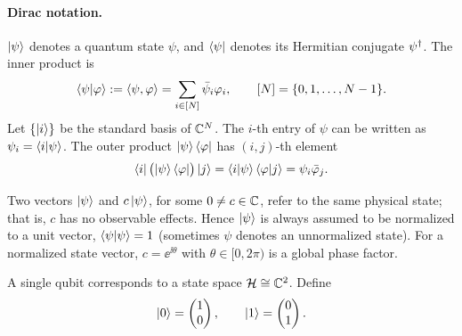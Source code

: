 \paragraph{Dirac notation.}
$\ket{\psi}$ denotes a quantum state $\psi$, and $\bra{\psi}$ denotes its
Hermitian conjugate $\psi^{\dagger}$. The inner product is
\begin{equation}
  \braket{\psi|\varphi} := \langle \psi, \varphi \rangle
  = \sum_{i \in [N]} \bar{\psi}_i \varphi_i,
  \qquad [N] = \{0, 1, \dots, N-1\}.
\end{equation}
Let $\{\ket{i}\}$ be the standard basis of $\mathbb{C}^N$. The $i$-th entry of $\psi$ can
be written as $\psi_i = \braket{i|\psi}$. The outer product $\ket{\psi}\bra{\varphi}$
has $(i,j)$-th element
\begin{equation}
  \bra{i}\bigl(\ket{\psi}\bra{\varphi}\bigr)\ket{j}
  = \braket{i|\psi}\braket{\varphi|j} = \psi_i \bar{\varphi}_j.
\end{equation}

Two vectors $\ket{\psi}$ and $c\ket{\psi}$, for some $0 \neq c \in \mathbb{C}$, refer to
the same physical state; that is, $c$ has no observable effects. Hence
$\ket{\psi}$ is always assumed to be normalized to a unit vector,
$\braket{\psi|\psi} = 1$ (sometimes $\psi$ denotes an unnormalized state). For a
normalized state vector, $c = \ee^{\ii\theta}$ with $\theta \in [0, 2\pi)$ is a
global phase factor.

\begin{example}
A single qubit corresponds to a state space $\mathcal{H} \cong \mathbb{C}^2$. Define
\begin{equation}
  \ket{0} = \begin{pmatrix} 1 \\ 0 \end{pmatrix}, \qquad
  \ket{1} = \begin{pmatrix} 0 \\ 1 \end{pmatrix}.
\end{equation}
\end{example}

